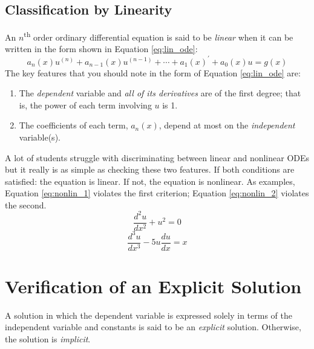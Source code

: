 \subsection{Classification by Linearity}
An $n$\textsuperscript{th} order ordinary differential equation is said to be \emph{linear} when it can be written in the form shown in Equation \ref{eq:lin_ode}:
\begin{equation}
a_n(x)u^{(n)}+a_{n-1}(x)u^{(n-1)}+\cdots+a_1(x)^{\prime}+a_0(x)u = g(x)
\label{eq:lin_ode}
\end{equation}
The key features that you should note in the form of Equation \ref{eq:lin_ode} are:
\begin{enumerate}
\item The \emph{dependent} variable and \emph{all of its derivatives} are of the first degree; that is, the power of each term involving $u$ is 1.
\item The coefficients of each term, $a_n(x)$, depend at most on the \emph{independent} variable(s).
\end{enumerate}
A lot of students struggle with discriminating between linear and nonlinear ODEs but it really is as simple as checking these two features.  If both conditions are satisfied: the equation is linear.  If not, the equation is nonlinear.  As examples, Equation \ref{eq:nonlin_1} violates the first criterion; Equation \ref{eq:nonlin_2} violates the second.
\begin{equation}
\frac{d^2u}{dx^2}+u^2 = 0 
\label{eq:nonlin_1}
\end{equation}
\begin{equation}
\frac{d^3u}{dx^3}-5u\frac{du}{dx}=x
\label{eq:nonlin_2}
\end{equation}
\section{Verification of an Explicit Solution} 
A solution in which the dependent variable is expressed solely in terms of the independent variable and constants is said to be an \emph{explicit} solution. Otherwise, the solution is \emph{implicit}. 


